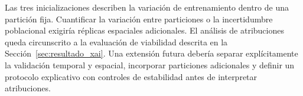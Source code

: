 Las tres inicializaciones describen la variación de entrenamiento dentro de una partición fija. Cuantificar la variación entre particiones o la incertidumbre poblacional exigiría réplicas espaciales adicionales. El análisis de atribuciones queda circunscrito a la evaluación de viabilidad descrita en la Sección~\ref{sec:resultado_xai}. Una extensión futura debería separar explícitamente la validación temporal y espacial, incorporar particiones adicionales y definir un protocolo explicativo con controles de estabilidad antes de interpretar atribuciones.

